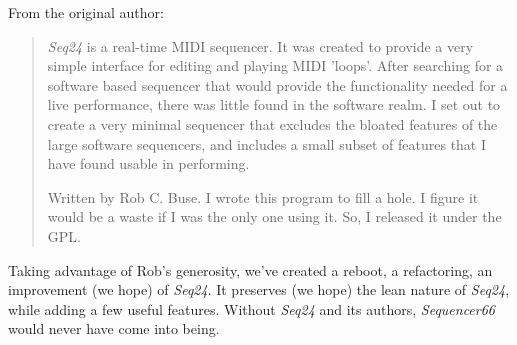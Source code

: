    From the original author:

   \begin{quotation}
      \textsl{Seq24} is a real-time MIDI sequencer. It was created to
      provide a very simple interface for editing and playing MIDI 'loops'.
      After searching for a software based sequencer that would provide the
      functionality needed for a live performance, there was little found in
      the software realm. I set out to create a very minimal sequencer that
      excludes the bloated features of the large software sequencers, and
      includes a small subset of features that I have found usable in
      performing. 

      Written by Rob C. Buse.  I wrote this program to fill a
      hole.  I figure it would be a waste if I was the only one
      using it.  So, I released it under the GPL.
   \end{quotation}

   Taking advantage of Rob's generosity,
   we've created a reboot, a refactoring, an improvement (we hope) of
   \textsl{Seq24}.  It preserves (we hope) the lean nature of \textsl{Seq24},
   while adding a few useful features.
   Without \textsl{Seq24} and its authors,
   \textsl{Sequencer66} would never have come into being.

